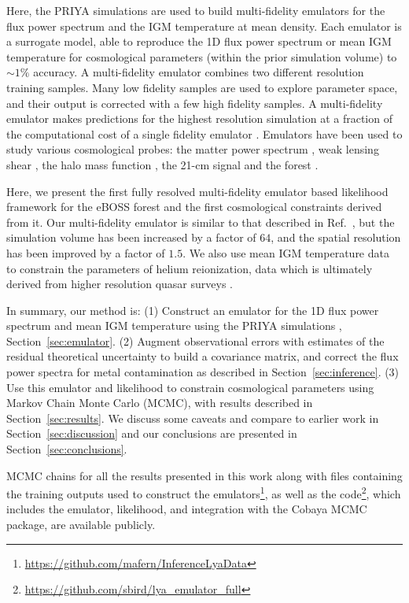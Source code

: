 Here, the PRIYA simulations are used to build multi-fidelity emulators \cite{2019JCAP...02..050B, 2022MNRAS.509.2551H, 2022MNRAS.517.3200F} for the flux power spectrum and the IGM temperature at mean density.
Each emulator is a surrogate model, able to reproduce the 1D flux power spectrum or mean IGM temperature for cosmological parameters (within the prior simulation volume) to $\sim 1 \%$ accuracy.
A multi-fidelity emulator combines two different resolution training samples.
Many low fidelity samples are used to explore parameter space, and their output is corrected with a few high fidelity samples.
A multi-fidelity emulator makes predictions for the highest resolution simulation at a fraction of the computational cost of a single fidelity emulator \cite{10.1093/biomet/87.1.1, 2022MNRAS.509.2551H}.
Emulators have been used to study various cosmological probes: the matter power spectrum \citep{Heitmann:2009, Heitmann:2014, Lawrence:2017, Giblin:2019, Euclid:2021, Arico:2021, Giri:2021}, weak lensing shear \citep{Harnois:2019, Davies:2021}, the halo mass function \citep{McClintock:2019, Nishimichi:2019, Bocquet:2022}, the 21-cm signal \citep{Kern:2017, Cohen:2020, Bevins:2021, Bye:2022} and the \lya forest \citep{2019JCAP...02..050B, Rogers:2019, 2021JCAP...05..033P, 2021JCAP...04..059W, Rogers:2021a,2021PhRvL.126g1302R, 2023MNRAS.tmp.2406C}.

Here, we present the first fully resolved multi-fidelity emulator based likelihood framework for the eBOSS \lya forest and the first cosmological constraints derived from it.
Our multi-fidelity emulator is similar to that described in Ref.~\cite{2022MNRAS.517.3200F}, but the simulation volume has been increased by a factor of $64$, and the spatial resolution has been improved by a factor of $1.5$.
We also use mean IGM temperature data \cite{2021MNRAS.506.4389G} to constrain the parameters of helium reionization, data which is ultimately derived from higher resolution quasar surveys \citep{2017MNRAS.466.4332I, 2022MNRAS.509.2842K, 2019MNRAS.489.2536D}.

In summary, our method is: (1) Construct an emulator for the 1D \lya flux power spectrum and mean IGM temperature using the PRIYA simulations \cite{2023simsuite}, Section~\ref{sec:emulator}.
(2) Augment observational errors with estimates of the residual theoretical uncertainty to build a covariance matrix, and correct the flux power spectra for metal contamination as described in Section~\ref{sec:inference}.
(3) Use this emulator and likelihood to constrain cosmological parameters using Markov Chain Monte Carlo (MCMC), with results described in Section~\ref{sec:results}.
We discuss some caveats and compare to earlier work in Section~\ref{sec:discussion} and our conclusions are presented in Section~\ref{sec:conclusions}.

MCMC chains for all the results presented in this work along with files containing the training outputs used to construct the emulators\footnote{\url{https://github.com/mafern/InferenceLyaData}}, as well as the code\footnote{\url{https://github.com/sbird/lya_emulator_full}}, which includes the emulator, likelihood, and integration with the Cobaya MCMC package, are available publicly.
